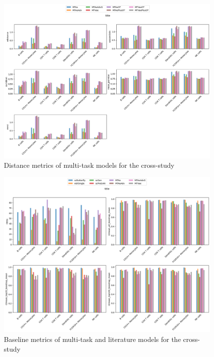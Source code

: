 \documentclass[12pt, a4paper]{article}
\begin{document}
\begin{figure}[h!]
    \centering
    \includegraphics[width=.85\textwidth]{multi_task_benchmarking_cell_type_distance_metrics_cross_study.png}
    \caption{Distance metrics of multi-task models for the cross-study}
\end{figure}

\begin{figure}[h!]
    \centering
    \includegraphics[width=.85\textwidth]{selected_benchmarking_cell_type_baseline_metrics_cross_study.png}
    \caption{Baseline metrics of multi-task and literature models for the cross-study}
    \label{}
\end{figure}
\end{document}
